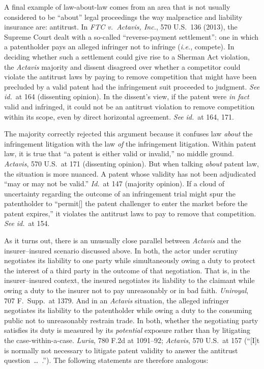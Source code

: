 \documentclass[
  12pt,
  letterpaper,
]{scrartcl}
\begin{document}
A final example of law-about-law comes from an area that is not usually
considered to be ``about'' legal proceedings the way malpractice and liability
insurance are: antitrust. In \textit{FTC v.~Actavis, Inc.}, 570 U.S.~136
(2013), the Supreme Court dealt with a so-called ``reverse-payment
settlement'': one in which a patentholder pays an alleged infringer not to
infringe (\textit{i.e.}, compete). In deciding whether such a settlement could give rise to a Sherman Act
violation, the \textit{Actavis} majority and dissent disagreed over whether a
competitor could violate the antitrust laws by paying to remove competition
that might have been precluded by a valid patent had the infringement suit
proceeded to judgment. \textit{See} \textit{id.}~at 164 (dissenting opinion).
In the dissent's view, if the patent were \emph{in fact} valid and infringed,
it could not be an antitrust violation to remove competition within its scope, even by direct horizontal agreement.
\textit{See} \textit{id.}~at 164, 171.

The majority correctly rejected this argument because it confuses law
\textit{about} the infringement litigation with the law \textit{of} the
infringement litigation. Within patent law, it is true that ``a patent is
either valid or invalid,'' no middle ground. \textit{Actavis}, 570 U.S.~at 171
(dissenting opinion). But when talking \textit{about} patent law, the situation is more nuanced. A patent whose validity has not been adjudicated
``may or may not be valid.'' \textit{Id.}~at 147 (majority opinion). If a cloud
of uncertainty regarding the outcome of an infringement trial might spur the
patentholder to ``permit[] the patent challenger to enter the market before the
patent expires,'' it violates the antitrust laws to pay to remove that
competition. \textit{See} \textit{id.}~at 154.

As it turns out, there is an unusually close parallel between \textit{Actavis} and the
insurer--insured scenario discussed above. In both, the actor under scrutiny
negotiates its liability to one party while simultaneously owing a duty to
protect the interest of a third party in the outcome of that negotiation.
That is, in the insurer--insured context, the insured negotiates its liability to the
claimant while owing a duty to the insurer not to pay unreasonably or in bad
faith. \textit{Uniroyal}, 707 F.~Supp.~at 1379. And in an \emph{Actavis} situation,
the alleged infringer negotiates its liability to the patentholder while owing
a duty to the consuming public not to unreasonably restrain trade. In both,
whether the negotiating party satisfies its duty is measured by its
\emph{potential} exposure rather than by litigating the case-within-a-case.
\textit{Luria}, 780 F.2d at 1091--92; \textit{Actavis}, 570 U.S.~at 157 (``[I]t
is normally not necessary to litigate patent validity to answer the antitrust
question~\ldots~.''). The following statements are therefore analogous:
\end{document}
